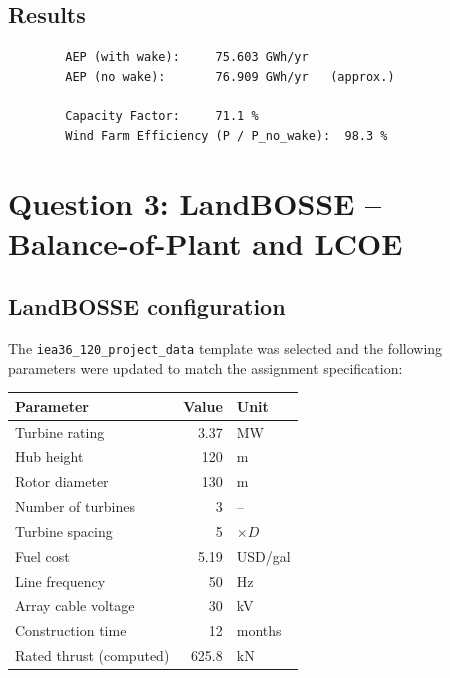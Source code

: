 \documentclass[11pt,a4paper]{article}
\begin{document}
	\subsection{Results}
	
	\begin{lstlisting}
		AEP (with wake):     75.603 GWh/yr
		AEP (no wake):       76.909 GWh/yr   (approx.)
		
		Capacity Factor:     71.1 %
		Wind Farm Efficiency (P / P_no_wake):  98.3 %
	\end{lstlisting}
	
	\section{Question 3: LandBOSSE -- Balance-of-Plant and LCOE}
	
	\subsection{LandBOSSE configuration}
	
	The \texttt{iea36\_120\_project\_data} template was selected and the following
	parameters were updated to match the assignment specification:
	
	\begin{center}
		\begin{tabular}{lrl}
			\toprule
			\textbf{Parameter} & \textbf{Value} & \textbf{Unit} \\
			\midrule
			Turbine rating         & 3.37   & MW \\
			Hub height             & 120    & m  \\
			Rotor diameter         & 130    & m  \\
			Number of turbines     & 3      & -- \\
			Turbine spacing        & 5      & $\times D$ \\
			Fuel cost              & 5.19   & USD/gal \\
			Line frequency         & 50     & Hz \\
			Array cable voltage    & 30     & kV \\
			Construction time      & 12     & months \\
			Rated thrust (computed)& 625.8  & kN \\
			\bottomrule
		\end{tabular}
	\end{center}
	
\end{document}
